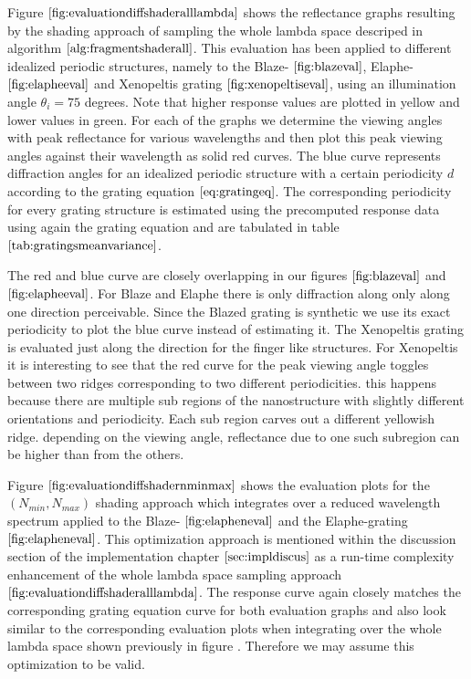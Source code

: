 
Figure $\ref{fig:evaluationdiffshaderalllambda}$ shows the reflectance graphs resulting by the shading approach of sampling the whole lambda space descriped in algorithm $\ref{alg:fragmentshaderall}$. This evaluation has been applied to different idealized periodic structures, namely to the Blaze- $\ref{fig:blazeval}$, Elaphe- $\ref{fig:elapheeval}$ and Xenopeltis grating $\ref{fig:xenopeltiseval}$, using an illumination angle $\theta_i = 75$ degrees. Note that higher response values are plotted in yellow and lower values in green. For each of the graphs we determine the viewing angles with peak reflectance for various wavelengths and then plot this peak viewing angles against their wavelength as solid red curves. The blue curve represents diffraction angles for an idealized periodic structure with a certain periodicity $d$ according to the grating equation $\ref{eq:gratingeq}$. The corresponding periodicity for every grating structure is estimated using the precomputed response data using again the grating equation and are tabulated in table $\ref{tab:gratingsmeanvariance}$. 

The red and blue curve are closely overlapping in our figures $\ref{fig:blazeval}$ and $\ref{fig:elapheeval}$. For Blaze and Elaphe there is only diffraction along only along one direction perceivable. Since the Blazed grating is synthetic we use its exact periodicity to plot the blue curve instead of estimating it. The Xenopeltis grating is evaluated just along the direction for the finger like structures. For Xenopeltis it is interesting to see that the red curve for the peak viewing angle toggles between two ridges corresponding to two different periodicities. this happens because there are multiple sub regions of the nanostructure with slightly different orientations and periodicity. Each sub region carves out a different yellowish ridge. depending on the viewing angle, reflectance due to one such subregion can be higher than from the others.

Figure $\ref{fig:evaluationdiffshadernminmax}$ shows the evaluation plots for the $(N_{min},N_{max})$ shading approach which integrates over a reduced wavelength spectrum applied to the Blaze- $\ref{fig:elapheneval}$ and the Elaphe-grating $\ref{fig:elapheneval}$. This optimization approach is mentioned within the discussion section of the implementation chapter $\ref{sec:impldiscus}$ as a run-time complexity enhancement of the whole lambda space sampling approach $\ref{fig:evaluationdiffshaderalllambda}$. The response curve again closely matches the corresponding grating equation curve for both evaluation graphs and also look similar to the corresponding evaluation plots when integrating over the whole lambda space shown previously in figure $\label{ref:evaluationdiffshaderalllambda}$. Therefore we may assume this optimization to be valid. 


